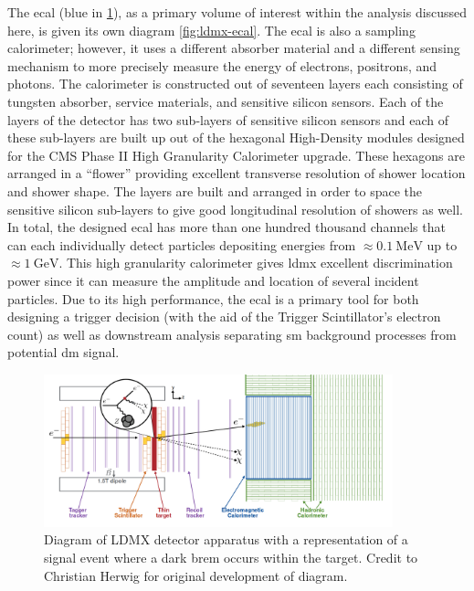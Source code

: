 The \ac{ecal} (blue in \cref{fig:ldmx-det}), as a primary volume of interest within the analysis
discussed here, is given its own diagram \cref{fig:ldmx-ecal}. The \ac{ecal} is also a sampling
calorimeter; however, it uses a different absorber material and a different sensing mechanism to
more precisely measure the energy of electrons, positrons, and photons. The calorimeter is
constructed out of seventeen layers each consisting of tungsten absorber, service materials, and
sensitive silicon sensors. Each of the layers of the detector has two sub-layers of sensitive
silicon sensors and each of these sub-layers are built up out of the hexagonal High-Density modules
designed for the CMS Phase II High Granularity Calorimeter upgrade\cite{cms-phase-2-tdr}. These
hexagons are arranged in a ``flower'' providing excellent transverse resolution of shower location
and shower shape. The layers are built and arranged in order to space the sensitive silicon
sub-layers to give good longitudinal resolution of showers as well. In total, the designed
\ac{ecal} has more than one hundred thousand channels that can each individually detect particles
depositing energies from $\approx \qty{0.1}{\mega\electronvolt}$ up to
$\approx\qty{1}{\giga\electronvolt}$.
This high granularity calorimeter gives \ac{ldmx} excellent discrimination power since it can
measure the amplitude and location of several incident particles.
Due to its high performance, the \ac{ecal} is a primary tool for both
designing a trigger decision (with the aid of the Trigger Scintillator's electron count) as well as
downstream analysis separating \ac{sm} background processes from potential \ac{dm} signal.

\begin{figure}
  \centering
  \includegraphics[width=0.9\textwidth]{figures/ldmx/experiment/detector.png}
  \caption{
    Diagram of LDMX detector apparatus with a representation of a signal event where
    a dark brem occurs within the target. Credit to Christian Herwig
    for original development of diagram.
  }
  \label{fig:ldmx-det}
\end{figure}


